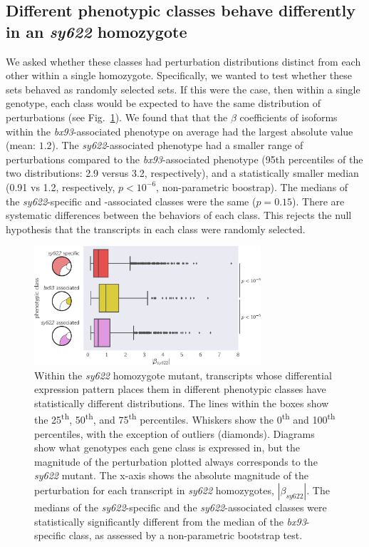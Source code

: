 \documentclass[10pt, twocolumn]{article}
\begin{document}
\subsection*{Different phenotypic classes behave differently in an
            \emph{sy622} homozygote}
We asked whether these classes had perturbation distributions distinct from each
other within a single homozygote. Specifically, we wanted to test whether these
sets behaved as randomly selected sets. If this were the case, then within a
single genotype, each class would be expected to have the same distribution of
perturbations (see Fig.~\ref{fig:classes}). We found that that the $\beta$
coefficients of isoforms within the \emph{bx93}-associated phenotype on average
had the largest absolute value (mean: $1.2$). The \emph{sy622}-associated
phenotype had a smaller range of perturbations compared to the
\emph{bx93}-associated phenotype (95th percentiles of the two distributions: 2.9
versus 3.2, respectively), and a statistically smaller median (0.91 vs 1.2,
respectively, $p < 10^{-6}$, non-parametric boostrap). The medians of the
\emph{sy622}-specific and -associated classes were the same ($p=0.15$). There
are systematic differences between the behaviors of each class. This rejects the
null hypothesis that the transcripts in each class were randomly selected.

\begin{figure}
  \centering{}
  \includegraphics[width=0.75\textwidth]{../figs/dpy22_classes.pdf}
  \caption{
    Within the \emph{sy622} homozygote mutant, transcripts whose differential
    expression pattern places them in different phenotypic classes have
    statistically different distributions. The lines within the boxes show the
    25\textsuperscript{th}, 50\textsuperscript{th}, and 75\textsuperscript{th}
    percentiles. Whiskers show the 0\textsuperscript{th} and
    100\textsuperscript{th} percentiles, with the exception of outliers
    (diamonds). Diagrams show what genotypes each gene class is expressed in,
    but the magnitude of the perturbation plotted always corresponds to the
    \emph{sy622} mutant. The x-axis shows the absolute magnitude of the
    perturbation for each transcript in \emph{sy622} homozygotes,
    $|\beta_{sy622}|$. The medians of the \emph{sy622}-specific and the
    \emph{sy622}-associated classes were statistically significantly different
    from the median of the \emph{bx93}-specific class, as assessed by a
    non-parametric bootstrap test.
  }
\label{fig:classes}
\end{figure}
\end{document}
